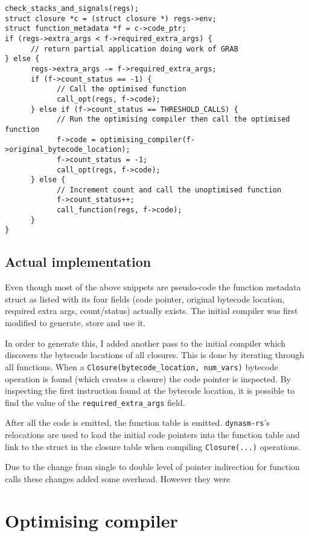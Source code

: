 \begin{verbatim}
check_stacks_and_signals(regs);
struct closure *c = (struct closure *) regs->env;
struct function_metadata *f = c->code_ptr;
if (regs->extra_args < f->required_extra_args) {
      // return partial application doing work of GRAB
} else { 
      regs->extra_args -= f->required_extra_args;
      if (f->count_status == -1) {
            // Call the optimised function
            call_opt(regs, f->code);
      } else if (f->count_status == THRESHOLD_CALLS) {
            // Run the optimising compiler then call the optimised function
            f->code = optimising_compiler(f->original_bytecode_location);
            f->count_status = -1;
            call_opt(regs, f->code);
      } else {
            // Increment count and call the unoptimised function 
            f->count_status++;
            call_function(regs, f->code);
      }
}
\end{verbatim}

\subsection{Actual implementation}

Even though most of the above snippets are pseudo-code the function metadata struct as listed with
its four fields (code pointer, original bytecode location, required extra args, count/status)
actually exists. The initial compiler was first modified to generate, store and use it.

In order to generate this, I added another pass to the initial compiler which discovers the
bytecode locations of all closures. This is done by iterating through all functions. When a
\texttt{Closure(bytecode\_location, num\_vars)} bytecode operation is found (which creates a
closure) the code pointer is inspected. By inspecting the first instruction found at the bytecode
location, it is possible to find the value of the \texttt{required\_extra\_args} field.

After all the code is emitted, the function table is emitted. \texttt{dynasm-rs}'s relocations are
used to load the initial code pointers into the function table and link to the struct in the
closure table when compiling \texttt{Closure(...)} operations.

Due to the change from single to double level of pointer indirection for function calls these
changes added some overhead. However they were

\section{Optimising compiler} \label{opt-comp}

